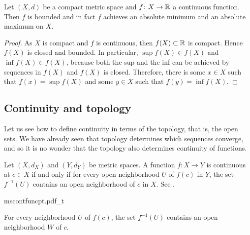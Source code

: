 \begin{thm}
Let $(X,d)$ be a compact metric space
and $f \colon X \to {\mathbb{R}}$ a continuous function.  Then
$f$ is bounded and in fact
$f$ achieves an absolute minimum and an absolute maximum on $X$.
\end{thm}

\begin{proof}
As $X$ is compact and $f$ is continuous, then
$f(X) \subset {\mathbb{R}}$ is compact.  Hence $f(X)$ is closed
and bounded.  In particular,
$\sup f(X) \in f(X)$ and
$\inf f(X) \in f(X)$, because both the sup and the inf
can be achieved by sequences in $f(X)$ and $f(X)$ is closed.
Therefore, there is some $x \in X$ such that $f(x) = \sup f(X)$
and some $y \in X$ such that $f(y) = \inf f(X)$.
\end{proof}

\subsection{Continuity and topology}

Let us see how to define continuity in terms of the topology, that is,
the open sets.  We have already seen that topology determines which 
sequences converge, and so it is no wonder that the topology also
determines continuity of functions.

\begin{lemma} \label{lemma:mstopocontloc}
Let $(X,d_X)$ and $(Y,d_Y)$ be metric spaces.
A function $f \colon X \to Y$ is continuous at $c \in X$
if and only if for every open neighborhood $U$ of $f(c)$ in $Y$, the set
$f^{-1}(U)$ contains an open neighborhood of $c$ in $X$.
See .
\end{lemma}

\begin{myfigureht}
{mscontfuncpt.pdf_t}
\caption{For every neighborhood $U$ of $f(c)$, the set $f^{-1}(U)$ contains an open
neighborhood $W$ of $c$.\label{fig:mscontfuncpt}}
\end{myfigureht}

